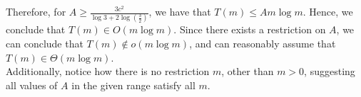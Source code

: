 Therefore, for $A \ge \frac{3c^2}{\log{3} + 2\log{\left( \frac{3}{2} \right)}}$, we have that
$T(m) \le A m \log{m}$. Hence, we conclude that $T(m) \in O\left( m \log{m} \right)$. Since there exists
a restriction on $A$, we can conclude that $T(m) \notin o\left( m \log{m} \right)$, and can reasonably
assume that $T(m) \in \Theta\left( m \log{m} \right)$. \\

Additionally, notice how there is no restriction $m$, other than $m > 0$, suggesting all values of $A$ in the given
range satisfy all $m$.